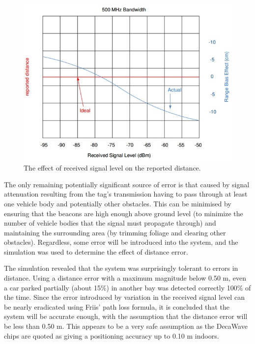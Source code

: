 \begin{figure}[H]
\begin{center}
\includegraphics[scale=0.8]{data/software/4.jpg}
\caption{The effect of received signal level on the reported distance.\cite{2}}
\label{fig:reported-distance}
\end{center}
\end{figure}

\newpage
The only remaining potentially significant source of error is that caused by signal attenuation resulting from the tag's transmission having to pass through at least one vehicle body and potentially other obstacles. This can be minimised by ensuring that the beacons are high enough above ground level (to minimize the number of vehicle bodies that the signal must propagate through) and maintaining the surrounding area (by trimming foliage and clearing other obstacles). Regardless, some error will be introduced into the system, and the simulation was used to determine the effect of distance error.

The simulation revealed that the system was surprisingly tolerant to errors in distance. Using a distance error with a maximum magnitude below 0.50 m, even a car parked partially (about 15\%) in another bay was detected correctly 100\% of the time. Since the error introduced by variation in the received signal level can be nearly eradicated using Friis' path loss formula, it is concluded that the system will be accurate enough, with the assumption that the distance error will be less than 0.50 m. This appears to be a very safe assumption as the DecaWave chips are quoted as giving a positioning accuracy up to 0.10 m indoors.\cite{3}

